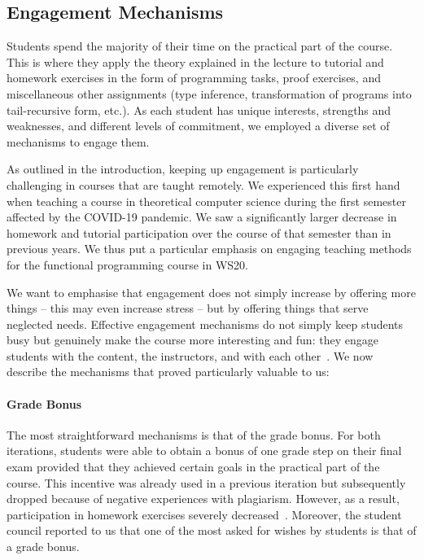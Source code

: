 \subsection{Engagement Mechanisms}\label{sec:engagement}

Students spend the majority of their time on the practical part of the course.
This is where they apply the theory explained in the lecture to tutorial and homework exercises in the form of programming tasks, proof exercises, and miscellaneous other assignments (type inference, transformation of programs into tail-recursive form, etc.).
As each student has unique interests, strengths and weaknesses, and different levels of commitment,
we employed a diverse set of mechanisms to engage them.

As outlined in the introduction, keeping up engagement is particularly challenging in courses that are taught remotely.
We experienced this first hand when teaching a course in theoretical computer science during the first semester affected by the COVID-19 pandemic.
We saw a significantly larger decrease in homework and tutorial participation over the course of that semester than in previous years.
We thus put a particular emphasis on engaging teaching methods for the functional programming course in WS20.

We want to emphasise that engagement does not simply
increase by offering more things -- this may even increase stress --
but by offering things that serve neglected needs.
Effective engagement mechanisms do not simply keep students busy
but genuinely make the course more interesting and fun:
they engage students with the content,
the instructors,
and with each other~\cite{onlineengagement3,onlineengagement2,engagementproposals}.
We now describe the mechanisms that proved particularly valuable to us:

\paragraph{Grade Bonus}
The most straightforward mechanisms is
that of the grade bonus.
For both iterations,
students were able to obtain a bonus of one grade step on their final exam provided that they achieved certain goals in the practical part of the course.
This incentive was already used in a previous iteration
but subsequently dropped because of negative experiences with plagiarism.
However, as a result, participation in homework exercises
severely decreased~\cite{next_1100}.
Moreover, the student council reported to us that one of the most asked for
wishes by students is that of a grade bonus.

